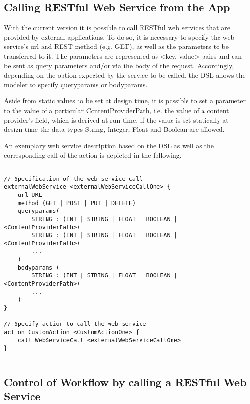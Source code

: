 
\subsection{Calling RESTful Web Service from the App}
\label{subsec: CallingWebServices}
With the current \MD version it is possible to call RESTful web services that are provided by external applications. To do so, it is necessary to specify the web service's url and REST method (e.g. GET), as well as the parameters to be transferred to it. The parameters are represented as <key, value> pairs and can be sent as query parameters and/or via the body of the request. Accordingly, depending on the option expected by the service to be called, the DSL allows the modeler to specify queryparams or bodyparams. 

Aside from static values to be set at design time, it is possible to set a parameter to the value of a particular ContentProviderPath, i.e. the value of a content provider's field, which is derived at run time. If the value is set statically at design time the data types String, Integer, Float and Boolean are allowed. 

An exemplary web service description based on the DSL as well as the corresponding call of the action is depicted in the following.

\begin{lstlisting}[language=MD2, label=lst:callWSfromWF, caption=Calling a Web Service From Within a Workflow]

// Specification of the web service call
externalWebService <externalWebServiceCallOne> {
	url URL
	method (GET | POST | PUT | DELETE)
	queryparams(
		STRING : (INT | STRING | FLOAT | BOOLEAN | <ContentProviderPath>)	
		STRING : (INT | STRING | FLOAT | BOOLEAN | <ContentProviderPath>)
		...	
	)
	bodyparams (
		STRING : (INT | STRING | FLOAT | BOOLEAN | <ContentProviderPath>)
		...
	)
}

// Specify action to call the web service
action CustomAction <CustomActionOne> {
	call WebServiceCall <externalWebServiceCallOne>
}
	
\end{lstlisting}





\subsection{Control of Workflow by calling a RESTful Web Service}
\label{subsec: WorkflowControlThroughWS}